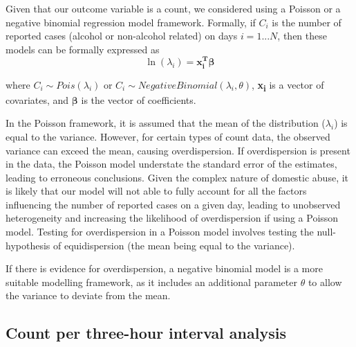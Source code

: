 \documentclass[12pt, a4paper]{article}
\newcommand{\vect}[1]{\boldsymbol{#1}}
\begin{document}
Given that our outcome variable is a count, we considered using a Poisson or a negative binomial regression model framework. Formally, if $C_i$ is the number of reported cases (alcohol or non-alcohol related) on days $i = 1...N$, then these models can be formally expressed as
%
\begin{equation}
 \ln(\lambda_i) =\vect{x_i^{T}}\vect{\beta}
\end{equation}


where 
$C_i \sim Pois(\lambda_i)$ or $C_i \sim Negative Binomial(\lambda_i,\theta)$, \textbf{x\textsubscript{i}} is a vector of covariates, and $\boldsymbol{\beta}$ is the vector of coefficients.

In the Poisson framework, it is assumed that the mean of the distribution ($\lambda_i$) is equal to the variance. However, for certain types of count data, the observed variance can exceed the mean, causing overdispersion. If overdispersion is present in the data, the Poisson model understate the standard error of the estimates, leading to erroneous conclusions. Given the complex nature of domestic abuse, it is likely that our model will not able to fully account for all the factors influencing the number of reported cases on a given day, leading to unobserved heterogeneity and increasing the likelihood of overdispersion if using a Poisson model. Testing for overdispersion in a Poisson model involves testing the null-hypothesis of equidispersion (the mean being equal to the variance).

If there is evidence for overdispersion, a negative binomial model is a more suitable modelling framework, as it includes an additional parameter $\theta$ to allow the variance to deviate from the mean. 


\subsection{Count per three-hour interval analysis}
\end{document}
